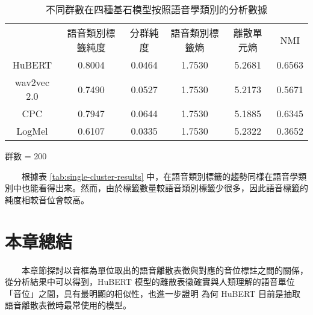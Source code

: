 \begin{table}[!htbp]
            \vspace{0.5cm}        

            \begin{subtable}[t]{\textwidth}
                \centering
                \begin{tabular}{cccccc}
                                & 語音類別標籤純度 & 分群純度 & 語音類別標籤熵 & 離散單元熵 &     NMI \\
                    HuBERT      &           0.8004 &   0.0464 &         1.7530 &     5.2681 &  0.6563 \\   %
                    wav2vec 2.0 &           0.7490 &   0.0527 &         1.7530 &     5.2173 &  0.5671 \\   %
                    CPC         &           0.7947 &   0.0644 &         1.7530 &     5.1885 &  0.6345 \\   %
                    LogMel      &           0.6107 &   0.0335 &         1.7530 &     5.2322 &  0.3652 \\   %
                \end{tabular}
                \caption{群數 = 200}
                \label{tab:ch3-clu200}
            \end{subtable}        

            \caption{不同群數在四種基石模型按照語音學類別的分析數據}
            \label{tab:single-cluster-phonetype-results}
        \end{table}
        　　根據表 \ref{tab:single-cluster-results} 中，在語音類別標籤的趨勢同樣在語音學類別中也能看得出來。然而，由於標籤數量較語音類別標籤少很多，因此語音標籤的純度相較音位會較高。


\section{本章總結}

　　本章節探討以音框為單位取出的語音離散表徵與對應的音位標註之間的關係，從分析結果中可以得到，HuBERT 模型的離散表徵確實與人類理解的語音單位「音位」之間，具有最明顯的相似性，也進一步證明
為何 HuBERT 目前是抽取語音離散表徵時最常使用的模型。
